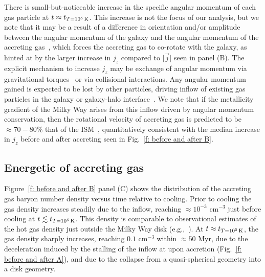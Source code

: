 \documentclass[fleqn,usenatbib]{mnras}
\newcommand{\tcon}{t_{T=10^5\,{\rm K}}}
\begin{document}
There is small-but-noticeable increase in the specific angular momentum of each gas particle at $t \approx \tcon$.
This increase is not the focus of our analysis, but we note that it may be a result of a difference in orientation and/or amplitude between the angular momentum of the galaxy and the angular momentum of the accreting gas~\citep[e.g.][]{Danovich2012, DeFelippis2017}, which forces the accreting gas to co-rotate with the galaxy, as hinted at by the larger increase in $j_z$ compared to $\vert \vec j \vert$ seen in panel (B).
The explicit mechanism to increase $j_z$ may be exchange of angular momentum via gravitational torques~\citep[e.g.][]{Danovich2015} or via collisional interactions.
Any angular momentum gained is expected to be lost by other particles, driving inflow of existing gas particles in the galaxy or galaxy-halo interface~\citep[e.g.][]{Mayor1981, Pezzulli2017}.
We note that if the metallicity gradient of the Milky Way arises from this inflow driven by angular momentum conservation, then the rotational velocity of accreting gas is predicted to be $\approx 70-80\%$ that of the ISM~\citep{Pezzulli2016a}, quantitatively consistent with the median increase in $j_z$ before and after accreting seen in Fig.~\ref{f: before and after B}.

\subsection{Energetic of accreting gas}
\label{s: mechanics -- energy balance}

Figure~\ref{f: before and after B} panel (C) shows the distribution of the accreting gas baryon number density  versus time relative to cooling. Prior to cooling the gas density increases steadily due to the inflow, reaching $\approx10^{-3}$ cm$^{-3}$ just before cooling at $t\lesssim\tcon$. This density is comparable to observational estimates of the hot gas density just outside the Milky Way disk (e.g.,~\cite{LiBregman2017}). At $t\approx\tcon$, the gas density sharply increases, reaching $0.1$ cm$^{-3}$ within $\approx50$ Myr, due to the deceleration induced by the stalling of the inflow at upon accretion (Fig.~\ref{f: before and after A}), and due to the collapse from a quasi-spherical geometry into a disk geometry. 
\end{document}

